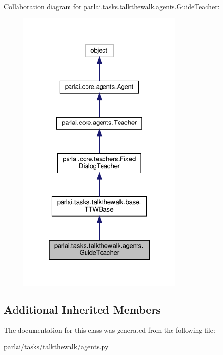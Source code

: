 Collaboration diagram for parlai.\+tasks.\+talkthewalk.\+agents.\+Guide\+Teacher\+:
\nopagebreak
\begin{figure}[H]
\begin{center}
\leavevmode
\includegraphics[width=235pt]{classparlai_1_1tasks_1_1talkthewalk_1_1agents_1_1GuideTeacher__coll__graph}
\end{center}
\end{figure}
\subsection*{Additional Inherited Members}


The documentation for this class was generated from the following file\+:\begin{DoxyCompactItemize}
\item 
parlai/tasks/talkthewalk/\hyperlink{parlai_2tasks_2talkthewalk_2agents_8py}{agents.\+py}\end{DoxyCompactItemize}
